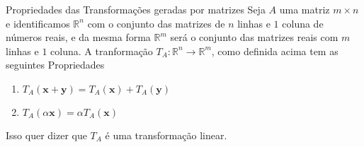 \documentclass{beamer}
\begin{document}
\begin{frame}{Propriedades das Transformações geradas por matrizes}
  Seja $A$ uma matriz $m\times n$ e identificamos
  $\mathbb{R}^n$ com o conjunto das matrizes de $n$ linhas e
  $1$ coluna de números reais, e da mesma forma $\mathbb{R}^m$ será
  o conjunto das matrizes reais com $m$ linhas e $1$ coluna.
  A tranformação $T_A:\mathbb{R}^n \to \mathbb{R}^m$, como definida acima
  tem as seguintes Propriedades
  \begin{enumerate}
    \item $T_A(\mathbf{x}+\mathbf{y}) = T_A(\mathbf{x}) + T_A(\mathbf{y})$
    \item $T_A(\alpha \mathbf{x})=\alpha T_A(\mathbf{x})$
  \end{enumerate}
  Isso quer dizer que $T_A$ é uma transformação linear.
\end{frame}
\end{document}

